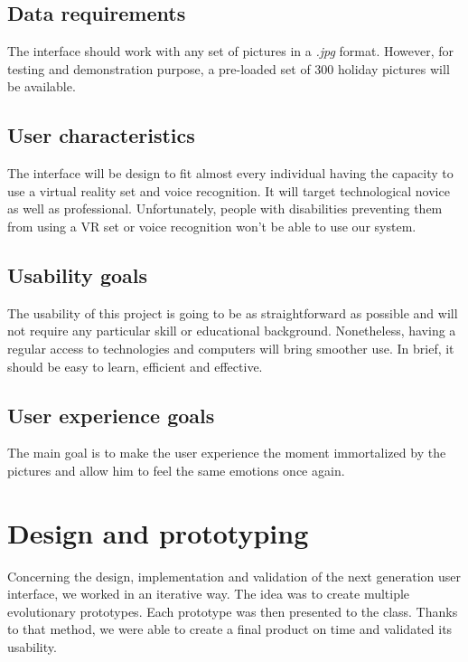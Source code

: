 \documentclass[11pt,a4paper]{article}
\begin{document}
\subsection{Data requirements}

The interface should work with any set of pictures in a \textit{.jpg} format. However, for testing and demonstration purpose, a pre-loaded set of 300 holiday pictures will be available.

\subsection{User characteristics}

The interface will be design to fit almost every individual having the capacity to use a virtual reality set and voice recognition. It will target technological novice as well as professional. Unfortunately, people with disabilities preventing them from using a VR set or voice recognition won't be able to use our system.

\subsection{Usability goals}

The usability of this project is going to be as straightforward as possible and will not require any particular skill or educational background. Nonetheless, having a regular access to technologies and computers will bring smoother use. In brief, it should be easy to learn, efficient and effective.

\subsection{User experience goals}

The main goal is to make the user experience the moment immortalized by the pictures and allow him to feel the same emotions once again. %

\section{Design and prototyping}

Concerning the design, implementation and validation of the next generation user interface, we worked in an iterative way.
The idea was to create multiple evolutionary prototypes. Each prototype was then presented to the class. Thanks to that method, we were able to create a final product on time and validated its usability.
\end{document}
